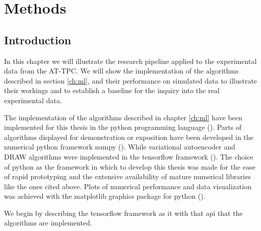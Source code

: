 \chapter{Methods}
\section{Introduction}

In this  chapter we will illustrate the research pipeline applied to the experimental data from the AT-TPC. We will show the implementation of the algorithms described in section \ref{ch:ml}, and their performance on simulated data to illustrate their workings and to establish a baseline for the inquiry into the real experimental data.

The implementation of the algorithms described in chapter \ref{ch:ml} have been implemented for this thesis in the python programming language (\cite{python}). Parts of algorithms displayed for demonstration or exposition have been developed in the numerical python framework numpy (\cite{numpy}). While variational autoencoder and DRAW algorithms were implemented in the tensorflow framework (\cite{tensorflow}). The choice of python as the framework in which to develop this thesis was made for the ease of rapid prototyping and the extensive availability of mature numerical libraries like the ones cited above. Plots of numerical performance and data visualization was achieved with the matplotlib graphics package for python (\cite{matplotlib}).

We begin by describing the tensorflow framework as it with that api that the algorithms are implemented. 
